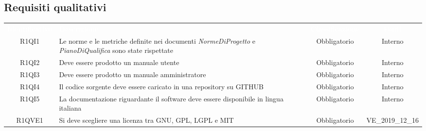 \subsection{Requisiti qualitativi}
{
\renewcommand{\arraystretch}{1.5}
\centering
\begin{longtable}{ c C{4cm} c c}
\textcolor{white}{\textbf{Identificativo}} & \textcolor{white}{\textbf{Descrizione}} & \textcolor{white}{\textbf{Classificazione}} & \textcolor{white}{\textbf{Fonti}}\\	

R1QI1 & Le norme e le metriche definite nei documenti \textit{NormeDiProgetto} e \textit{PianoDiQualifica} sono state rispettate & Obbligatorio & Interno\\

R1QI2 & Deve essere prodotto un manuale utente & Obbligatorio & Interno\\

R1QI3 & Deve essere prodotto un manuale amministratore & Obbligatorio & Interno\\

R1QI4 & Il codice sorgente deve essere caricato in una repository su GITHUB & Obbligatorio & Interno\\

R1QI5 & La documentazione riguardante il software deve essere disponibile in lingua italiana & Obbligatorio & Interno\\

R1QVE1 & Si deve scegliere una licenza tra GNU, GPL, LGPL e MIT& Obbligatorio & VE\_2019\_12\_16 \\

\end{longtable}
}